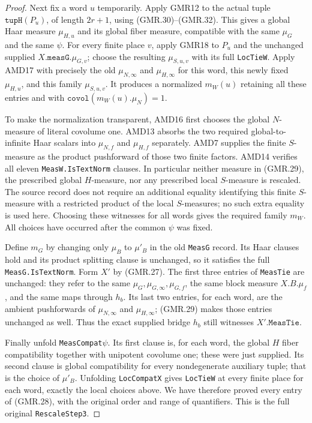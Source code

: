 \begin{proof}
Next fix a word $u$ temporarily.  Apply GMR12 to the actual tuple
$\texttt{tupH}(P_u)$, of length $2r+1$, using (GMR.30)--(GMR.32).
This gives a global Haar measure $\mu_{H,u}$ and its global fiber
measure, compatible with the same $\mu_G$ and the same $\psi$.
For every finite place $v$, apply GMR18 to $P_u$ and the unchanged
supplied $X.\texttt{measG}.\mu_{G,v}$; choose the resulting
$\mu_{S,u,v}$ with its full \texttt{LocTieW}.
Apply AMD17 with precisely the old $\mu_{N,\infty}$ and
$\mu_{H,\infty}$ for this word, this newly fixed $\mu_{H,u}$,
and this family $\mu_{S,u,v}$.  It produces a normalized
$m_W(u)$ retaining all these entries and with
$\texttt{covol}(m_W(u).\mu_N)=1$.

To make the normalization transparent, AMD16 first chooses the
global $N$-measure of literal covolume one.  AMD13 absorbs the
two required global-to-infinite Haar scalars into $\mu_{N,f}$ and
$\mu_{H,f}$ separately.  AMD7 supplies the finite $S$-measure as
the product pushforward of those two finite factors.  AMD14 verifies
all eleven \texttt{MeasW.IsTextNorm} clauses.  In particular neither
measure in (GMR.29), the prescribed global $H$-measure, nor any
prescribed local $S$-measure is rescaled.  The source record does
not require an additional equality identifying this finite
$S$-measure with a restricted product of the local $S$-measures;
no such extra equality is used here.
Choosing these witnesses for all words gives the required family
$m_W$.  All choices have occurred after the common $\psi$ was fixed.

Define $m_G$ by changing only $\mu_B$ to $\mu'_B$ in the old
\texttt{MeasG} record.  Its Haar clauses hold and its product
splitting clause is unchanged, so it satisfies the full
\texttt{MeasG.IsTextNorm}.  Form $X'$ by (GMR.27).
The first three entries of \texttt{MeasTie} are unchanged: they
refer to the same $\mu_G,\mu_{G,\infty},\mu_{G,f}$, the same
block measure $X.B.\mu_f$, and the same maps through $h_b$.
Its last two entries, for each word, are the ambient pushforwards
of $\mu_{N,\infty}$ and $\mu_{H,\infty}$; (GMR.29) makes those
entries unchanged as well.  Thus the exact supplied bridge $h_b$
still witnesses $X'.\texttt{MeasTie}$.

Finally unfold \texttt{MeasCompat\ensuremath{\psi}}.  Its first clause is,
for each word, the global $H$ fiber compatibility together with
unipotent covolume one; these were just supplied.  Its second clause
is global compatibility for every nondegenerate auxiliary tuple;
that is the choice of $\mu'_B$.  Unfolding
\texttt{LocCompatX} gives \texttt{LocTieW} at every finite place
for each word, exactly the local choices above.  We have therefore
proved every entry of (GMR.28), with the original order and range
of quantifiers.  This is the full original \texttt{RescaleStep3}.
\end{proof}

